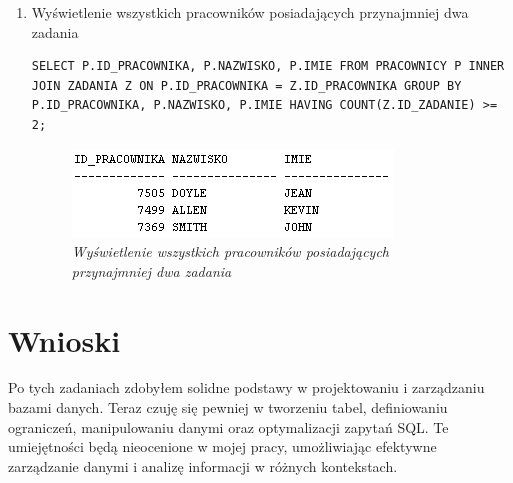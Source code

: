 \documentclass{article}
\begin{document}
\begin{enumerate}
\item Wyświetlenie wszystkich pracowników posiadających przynajmniej dwa zadania

\begin{lstlisting}[style=SQL, caption=\textit{Wyświetlenie wszystkich pracowników posiadających przynajmniej dwa zadania}]
SELECT P.ID_PRACOWNIKA, P.NAZWISKO, P.IMIE FROM PRACOWNICY P INNER JOIN ZADANIA Z ON P.ID_PRACOWNIKA = Z.ID_PRACOWNIKA GROUP BY P.ID_PRACOWNIKA, P.NAZWISKO, P.IMIE HAVING COUNT(Z.ID_ZADANIE) >= 2;
\end{lstlisting}

\begin{figure}[H]
	\centering
	\includegraphics[scale=1.2]{zadanie10.png}
	\caption{\textit{Wyświetlenie wszystkich pracowników posiadających przynajmniej dwa zadania}}
\end{figure}


\end{enumerate}
\section{Wnioski}

Po tych zadaniach zdobyłem solidne podstawy w projektowaniu i zarządzaniu bazami danych. Teraz czuję się pewniej w tworzeniu tabel, definiowaniu ograniczeń, manipulowaniu danymi oraz optymalizacji zapytań SQL. Te umiejętności będą nieocenione w mojej pracy, umożliwiając efektywne zarządzanie danymi i analizę informacji w różnych kontekstach.
\end{document}
